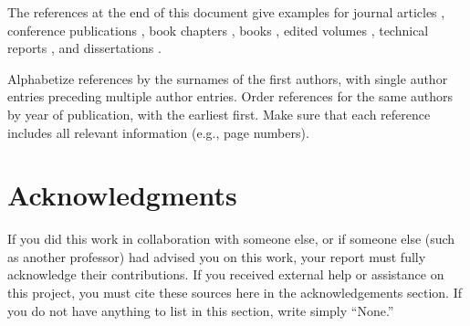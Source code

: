 \documentclass{article}
\begin{document}
The references at the end of this document give examples for journal
articles \cite{Samuel59}, conference publications \cite{langley00}, book chapters \cite{Newell81}, books \cite{DudaHart2nd}, edited volumes \cite{MachineLearningI}, 
technical reports \cite{mitchell80}, and dissertations \cite{kearns89}. 

Alphabetize references by the surnames of the first authors, with
single author entries preceding multiple author entries. Order
references for the same authors by year of publication, with the
earliest first. Make sure that each reference includes all relevant
information (e.g., page numbers).

\section*{Acknowledgments} 
 
If you did this work in collaboration with someone else, or if someone else (such as another professor) had advised you on this work, your report must fully acknowledge their contributions. If you received external help or assistance on this project, you must cite these sources here in the acknowledgements section.  If you do not have anything to list in this section, write simply ``None.''



\end{document}
